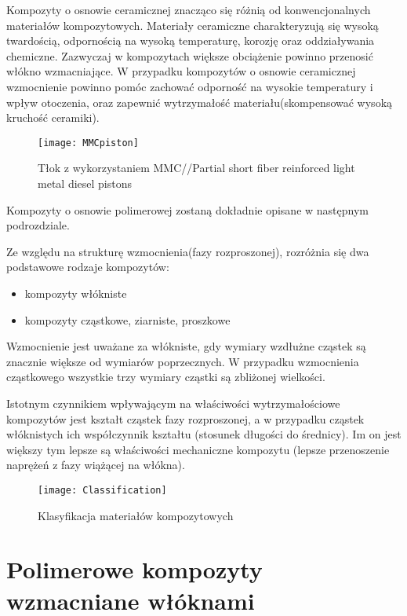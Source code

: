 \documentclass[magister,druk]{dyplom}
\begin{document}
Kompozyty o osnowie ceramicznej znacząco się różnią od konwencjonalnych materiałów kompozytowych. Materiały ceramiczne charakteryzują się wysoką twardością, odpornością na wysoką temperaturę, korozję oraz oddziaływania chemiczne. Zazwyczaj w kompozytach większe obciążenie powinno przenosić włókno wzmacniające. W przypadku kompozytów o osnowie ceramicznej wzmocnienie powinno pomóc zachować odporność na wysokie temperatury i wpływ otoczenia, oraz zapewnić wytrzymałość materiału(skompensować wysoką kruchość ceramiki).
     
\begin{figure}[H]
	\begin{center}
		\texttt{[image: MMCpiston]}
		\centering
	\end{center}
	\caption{Tłok z wykorzystaniem MMC//Partial short fiber reinforced
				light metal diesel pistons  }
\end{figure}

 

Kompozyty o osnowie polimerowej zostaną dokładnie opisane w następnym podrozdziale.

Ze względu na strukturę wzmocnienia(fazy rozproszonej), rozróżnia się dwa podstawowe rodzaje kompozytów:
\begin{itemize}
\item kompozyty włókniste
\item kompozyty cząstkowe, ziarniste, proszkowe
\end{itemize}

Wzmocnienie jest uważane za włókniste, gdy wymiary wzdłużne cząstek są znacznie większe od wymiarów poprzecznych. W przypadku wzmocnienia cząstkowego wszystkie trzy wymiary cząstki są zbliżonej wielkości.

Istotnym czynnikiem wpływającym na właściwości wytrzymałościowe kompozytów jest kształt cząstek fazy rozproszonej, a w przypadku cząstek włóknistych ich współczynnik kształtu (stosunek długości do średnicy). Im on jest większy tym lepsze są właściwości mechaniczne kompozytu (lepsze przenoszenie naprężeń z fazy wiążącej na włókna).\cite{Krolikowski2012}

\begin{figure}
	\texttt{[image: Classification]}
	\caption{Klasyfikacja materiałów kompozytowych}
\end{figure}


\section{Polimerowe kompozyty wzmacniane włóknami}
 
\end{document}
